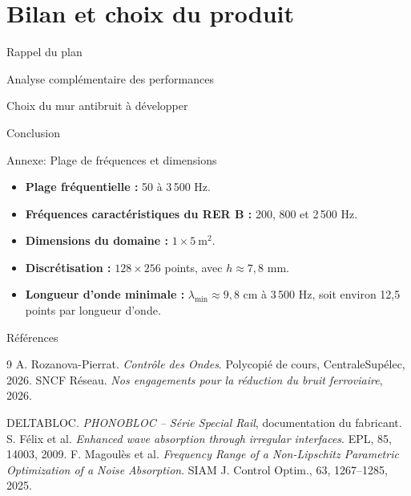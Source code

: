 \documentclass[12pt,aspectratio=169,t]{beamer}
\begin{document}
\section{Bilan et choix du produit}

\begin{frame}{Rappel du plan}
\footnotesize
\tableofcontents[currentsection]
\end{frame}

\begin{frame}{Analyse complémentaire des performances}
\end{frame}

\begin{frame}{Choix du mur antibruit à développer}

\end{frame}

\begin{frame}{Conclusion}

\end{frame}



\begin{frame}[noframenumbering]{Annexe: Plage de fréquences et dimensions}

\begin{itemize}
    \item \textbf{Plage fréquentielle :} 50 à 3\,500 Hz.
    \item \textbf{Fréquences caractéristiques du RER B :}
    200, 800 et 2\,500 Hz.
    \item \textbf{Dimensions du domaine :}
    $1 \times 5\ \mathrm{m^2}$.
    \item \textbf{Discrétisation :}
    $128 \times 256$ points, avec $h \approx 7{,}8$ mm.
    \item \textbf{Longueur d'onde minimale :}
    $\lambda_{\min} \approx 9{,}8$ cm à 3\,500 Hz,
    soit environ 12,5 points par longueur d'onde.
\end{itemize}

\end{frame}

\begin{frame}[noframenumbering]{Références}
\footnotesize
\begin{thebibliography}{9}
 A. Rozanova-Pierrat. \emph{Contrôle des Ondes}. Polycopié de cours, CentraleSupélec, 2026.
 SNCF Réseau. \emph{Nos engagements pour la réduction du bruit ferroviaire}, 2026.

 DELTABLOC. \emph{PHONOBLOC -- Série Special Rail}, documentation du fabricant.
 S. Félix et al. \emph{Enhanced wave absorption through irregular interfaces}. EPL, 85, 14003, 2009.
 F. Magoulès et al. \emph{Frequency Range of a Non-Lipschitz Parametric Optimization of a Noise Absorption}. SIAM J. Control Optim., 63, 1267--1285, 2025.
\end{thebibliography}
\end{frame}
\end{document}
